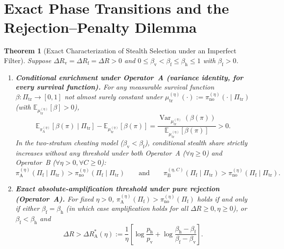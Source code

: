 \documentclass[11pt,a4paper]{article}
\newtheorem{theorem}{Theorem}
\newcommand{\E}{\mathbb{E}}
\newcommand{\Var}{\operatorname{Var}}
\begin{document}
\section{Exact Phase Transitions and the Rejection--Penalty Dilemma}

\begin{theorem}[Exact Characterization of Stealth Selection under an Imperfect Filter]\label{thm:selection}
Suppose $\Delta R_{\mathrm{v}} = \Delta R_{\mathrm{f}} = \Delta R > 0$ and $0 \le \beta_{\mathrm{v}} < \beta_{\mathrm{f}} \le \beta_{\mathrm{h}} \le 1$ with $\beta_{\mathrm{f}} > 0$.
\begin{enumerate}
  \item \textbf{Conditional enrichment under Operator~A (variance identity, for every survival function).} For any measurable survival function $\beta : \Pi_{\mathrm{tr}} \to [0, 1]$ not almost surely constant under $\mu_{\mathrm{tr}}^{(\eta)}(\cdot) := \pi_{\mathrm{no}}^{(\eta)}(\cdot \mid \Pi_{\mathrm{tr}})$ (with $\E_{\mu_{\mathrm{tr}}^{(\eta)}}[\beta] > 0$),
  \begin{equation}\label{eq:variance}
    \E_{\pi_{\mathrm{A}}^{(\eta)}}[\beta(\pi) \mid \Pi_{\mathrm{tr}}] - \E_{\mu_{\mathrm{tr}}^{(\eta)}}[\beta(\pi)]
    = \frac{\Var_{\mu_{\mathrm{tr}}^{(\eta)}}(\beta(\pi))}{\E_{\mu_{\mathrm{tr}}^{(\eta)}}[\beta(\pi)]} > 0.
  \end{equation}
  In the two-stratum cheating model ($\beta_{\mathrm{v}} < \beta_{\mathrm{f}}$), conditional stealth share strictly increases without any threshold under both Operator~A ($\forall \eta \ge 0$) and Operator~B ($\forall \eta > 0, \forall C \ge 0$):
  \begin{equation}
    \pi_{\mathrm{A}}^{(\eta)}(\Pi_{\mathrm{f}} \mid \Pi_{\mathrm{tr}}) > \pi_{\mathrm{no}}^{(\eta)}(\Pi_{\mathrm{f}} \mid \Pi_{\mathrm{tr}})
    \qquad \text{and} \qquad
    \pi_{\mathrm{B}}^{(\eta, C)}(\Pi_{\mathrm{f}} \mid \Pi_{\mathrm{tr}}) > \pi_{\mathrm{no}}^{(\eta)}(\Pi_{\mathrm{f}} \mid \Pi_{\mathrm{tr}}).
  \end{equation}

  \item \textbf{Exact absolute-amplification threshold under pure rejection (Operator~A).} For fixed $\eta > 0$, $\pi_{\mathrm{A}}^{(\eta)}(\Pi_{\mathrm{f}}) > \pi_{\mathrm{no}}^{(\eta)}(\Pi_{\mathrm{f}})$ holds if and only if either $\beta_{\mathrm{f}} = \beta_{\mathrm{h}}$ (in which case amplification holds for all $\Delta R \ge 0, \eta \ge 0$), or $\beta_{\mathrm{f}} < \beta_{\mathrm{h}}$ and
  \begin{equation}\label{eq:ampA}
    \Delta R > \Delta R_{\mathrm{A}}^*(\eta)
    := \frac{1}{\eta}\left[\log\frac{p_{\mathrm{h}}}{p_{\mathrm{v}}} + \log\frac{\beta_{\mathrm{h}} - \beta_{\mathrm{f}}}{\beta_{\mathrm{f}} - \beta_{\mathrm{v}}}\right].
  \end{equation}


\end{enumerate}
\end{theorem}
\end{document}
